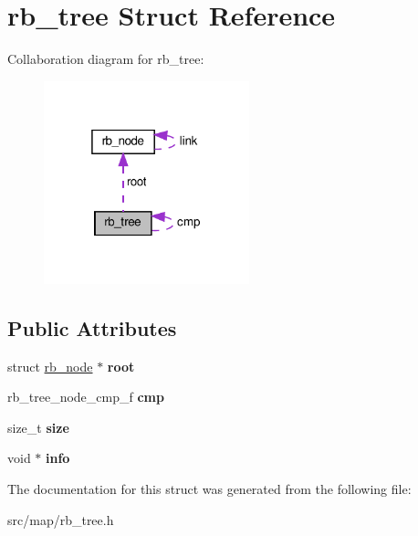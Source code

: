 \hypertarget{structrb__tree}{}\section{rb\+\_\+tree Struct Reference}
\label{structrb__tree}


Collaboration diagram for rb\+\_\+tree\+:\nopagebreak
\begin{figure}[H]
\begin{center}
\leavevmode
\includegraphics[width=169pt]{structrb__tree__coll__graph}
\end{center}
\end{figure}
\subsection*{Public Attributes}
\begin{DoxyCompactItemize}
\item 
\mbox{\label{structrb__tree_aaa514d45d7d3fb00e0b01bce1e2130a0}} 
struct \hyperlink{structrb__node}{rb\+\_\+node} $\ast$ {\bfseries root}
\item 
\mbox{\label{structrb__tree_a12b25635842ed1188e9b9598d47443e6}} 
rb\+\_\+tree\+\_\+node\+\_\+cmp\+\_\+f {\bfseries cmp}
\item 
\mbox{\label{structrb__tree_ab58b3455854ba1d62d56a9edb633fe00}} 
size\+\_\+t {\bfseries size}
\item 
\mbox{\label{structrb__tree_ab35a7ecb250e880e514364c254ec7a19}} 
void $\ast$ {\bfseries info}
\end{DoxyCompactItemize}


The documentation for this struct was generated from the following file\+:\begin{DoxyCompactItemize}
\item 
src/map/rb\+\_\+tree.\+h\end{DoxyCompactItemize}
